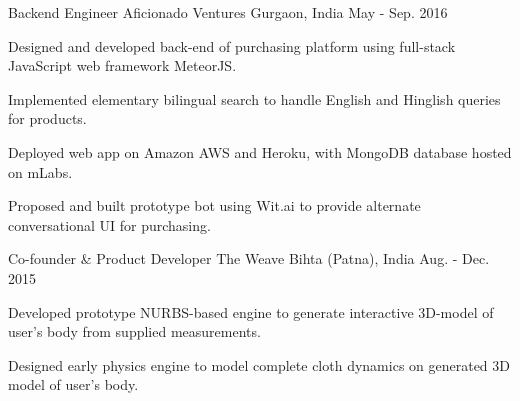 \begin{cventries}
	\cventry
		{Backend Engineer}
    	{Aficionado Ventures}
    	{Gurgaon, India}
    	{May - Sep. 2016}
    	{
	    \begin{cvitems}
    		\item{Designed and developed back-end of purchasing platform using full-stack JavaScript web framework MeteorJS.}
        	\item{Implemented elementary bilingual search to handle English and Hinglish queries for products.}
        	\item{Deployed web app on Amazon AWS and Heroku, with MongoDB database hosted on mLabs.}
        	\item{Proposed and built prototype bot using Wit.ai to provide alternate conversational UI for purchasing.}
		\end{cvitems}
    	}

  	\cventry
		{Co-founder \& Product Developer}
        {The Weave}
        {Bihta (Patna), India}
        {Aug. - Dec. 2015}
        {
		\begin{cvitems}
        	\item{Developed prototype NURBS-based engine to generate interactive 3D-model of user's body from supplied measurements.}
            \item{Designed early physics engine to model complete cloth dynamics on generated 3D model of user's body.}
      \end{cvitems}
    }
    
\end{cventries}
